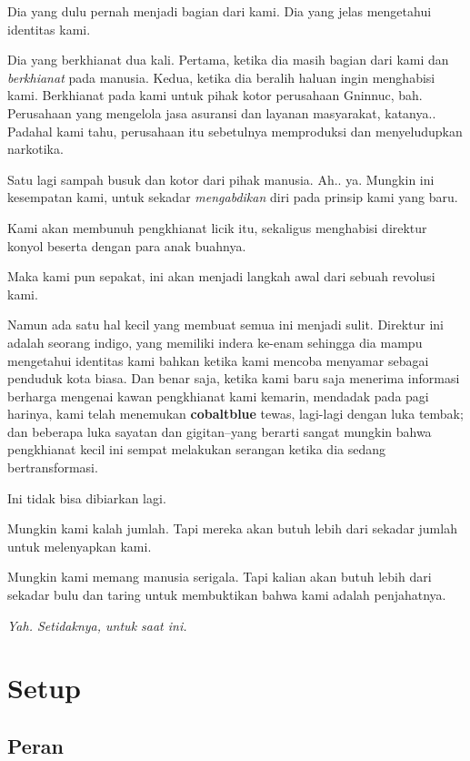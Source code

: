 \documentclass[]{book}
\begin{document}
Dia yang dulu pernah menjadi bagian dari kami. Dia yang jelas mengetahui
identitas kami.

Dia yang berkhianat dua kali. Pertama, ketika dia masih bagian dari kami
dan \emph{berkhianat} pada manusia. Kedua, ketika dia beralih haluan
ingin menghabisi kami. Berkhianat pada kami untuk pihak kotor perusahaan
Gninnuc, bah. Perusahaan yang mengelola jasa asuransi dan layanan
masyarakat, katanya.. Padahal kami tahu, perusahaan itu sebetulnya
memproduksi dan menyeludupkan narkotika.

Satu lagi sampah busuk dan kotor dari pihak manusia. Ah.. ya. Mungkin
ini kesempatan kami, untuk sekadar \emph{mengabdikan} diri pada prinsip
kami yang baru.

Kami akan membunuh pengkhianat licik itu, sekaligus menghabisi direktur
konyol beserta dengan para anak buahnya.

Maka kami pun sepakat, ini akan menjadi langkah awal dari sebuah
revolusi kami.

Namun ada satu hal kecil yang membuat semua ini menjadi sulit. Direktur
ini adalah seorang indigo, yang memiliki indera ke-enam sehingga dia
mampu mengetahui identitas kami bahkan ketika kami mencoba menyamar
sebagai penduduk kota biasa. Dan benar saja, ketika kami baru saja
menerima informasi berharga mengenai kawan pengkhianat kami kemarin,
mendadak pada pagi harinya, kami telah menemukan \textbf{cobaltblue}
tewas, lagi-lagi dengan luka tembak; dan beberapa luka sayatan dan
gigitan--yang berarti sangat mungkin bahwa pengkhianat kecil ini sempat
melakukan serangan ketika dia sedang bertransformasi.

Ini tidak bisa dibiarkan lagi.

Mungkin kami kalah jumlah. Tapi mereka akan butuh lebih dari sekadar
jumlah untuk melenyapkan kami.

Mungkin kami memang manusia serigala. Tapi kalian akan butuh lebih dari
sekadar bulu dan taring untuk membuktikan bahwa kami adalah penjahatnya.

\emph{Yah. Setidaknya, untuk saat ini.}

\section{Setup}\label{setup}

\subsection{Peran}\label{peran}
\end{document}
